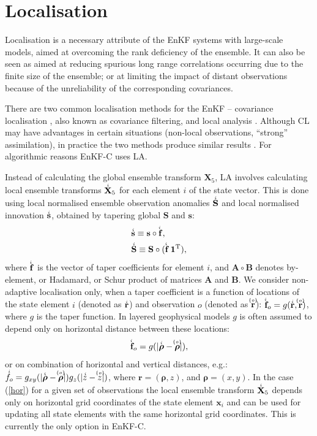 \documentclass[11pt]{report}
\newcommand{\mb} {\mathbf}
\newcommand{\ms} {\boldsymbol}
\newcommand{\T}{^{\tiny \mathrm T}}
\newcommand{\ac}{\accentset}
\begin{document}
\section{Localisation}

Localisation is a necessary attribute of the EnKF systems with large-scale models, aimed at overcoming the rank deficiency of the ensemble.
It can also be seen as aimed at reducing spurious long range correlations occurring due to the finite size of the ensemble; or at limiting the impact of distant observations because of the unreliability of the corresponding covariances.

There are two common localisation methods for the EnKF -- covariance localisation \citep[CL,][]{ham01b, hou01a}, also known as covariance filtering, and local analysis \citep[LA,][]{eve03a, ott03a}.
Although CL may have advantages in certain situations (non-local observations, ``strong'' assimilation), in practice the two methods produce similar results \citep{sak11a}.
For algorithmic reasons EnKF-C uses LA.

Instead of calculating the global ensemble transform $\mb X_5$, LA involves calculating local ensemble transforms $\ac{i}{\mb X}_5$ for each element $i$ of the state vector.
This is done using local normalised ensemble observation anomalies $\ac{i}{\mb S}$ and local normalised innovation $\ac{i}{\mb s}$, obtained by tapering global $\mb S$ and $\mb s$:
\begin{subequations}
  \begin{align}
    &\ac{i}{\mb s} \equiv \mb s \circ \ac{i}{\mb f},\\
    &\ac{i}{\mb S} \equiv \mb S \circ (\ac{i}{\mb f} \, \mb 1\T),
  \end{align}
\end{subequations}
where $\ac{i}{\mb f}$ is the vector of taper coefficients for element $i$, and $\mb A \circ \mb B$ denotes by-element, or Hadamard, or Schur product of matrices $\mb A$ and $\mb B$.
We consider non-adaptive localisation only, when a taper coefficient is a function of locations of the state element $i$ (denoted as $\ac{i}{\mb r}$) and observation $o$ (denoted as $\ac{\{o\}}{\mb r}$): $\ac{i}{\mb f}_o = g(\ac{i}{\mb r}, \ac{\{o\}}{\mb r})$, where $g$ is the taper function.
In layered geophysical models $g$ is often assumed to depend only on horizontal distance between these locations: 
\begin{align}
  \label{hor}
  \ac{i}{\mb f}_o = g(|\ac{i}{\ms \rho} - \ac{\{o\}}{\ms \rho}|),
\end{align}
or on combination of horizontal and vertical distances, e.g.: $\ac{i}f_o = g_{xy}(|\ac{i}{\ms \rho} - \ac{\{o\}}{\ms \rho}|)g_z(|\ac{i}z - \ac{\{o\}}z|)$, where $\mb r = (\ms \rho, z)$, and $\ms \rho = (x, y)$.
In the case (\ref{hor}) for a given set of observations the local ensemble transform $\ac{i}{\mb X}_5$ depends only on horizontal grid coordinates of the state element $\mb x_i$ and can be used for updating all state elements with the same horizontal grid coordinates.
This is currently the only option in EnKF-C.
\end{document}
